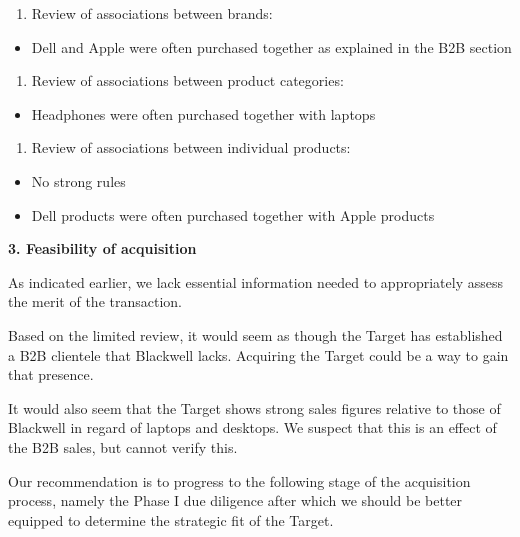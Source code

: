 \documentclass[]{article}
\providecommand{\tightlist}{%
  \setlength{\itemsep}{0pt}\setlength{\parskip}{0pt}}
\begin{document}
\begin{enumerate}
\def\labelenumi{\arabic{enumi}.}
\setcounter{enumi}{2}
\tightlist
\item
  Review of associations between brands:
\end{enumerate}

\begin{itemize}
\tightlist
\item
  Dell and Apple were often purchased together as explained in the B2B
  section
\end{itemize}

\begin{enumerate}
\def\labelenumi{\arabic{enumi}.}
\setcounter{enumi}{3}
\tightlist
\item
  Review of associations between product categories:
\end{enumerate}

\begin{itemize}
\tightlist
\item
  Headphones were often purchased together with laptops
\end{itemize}

\begin{enumerate}
\def\labelenumi{\arabic{enumi}.}
\setcounter{enumi}{4}
\tightlist
\item
  Review of associations between individual products:
\end{enumerate}

\begin{itemize}
\tightlist
\item
  No strong rules
\item
  Dell products were often purchased together with Apple products
\end{itemize}

\textbf{3. Feasibility of acquisition}

As indicated earlier, we lack essential information needed to
appropriately assess the merit of the transaction.

Based on the limited review, it would seem as though the Target has
established a B2B clientele that Blackwell lacks. Acquiring the Target
could be a way to gain that presence.

It would also seem that the Target shows strong sales figures relative
to those of Blackwell in regard of laptops and desktops. We suspect that
this is an effect of the B2B sales, but cannot verify this.

Our recommendation is to progress to the following stage of the
acquisition process, namely the Phase I due diligence after which we
should be better equipped to determine the strategic fit of the Target.
\end{document}
